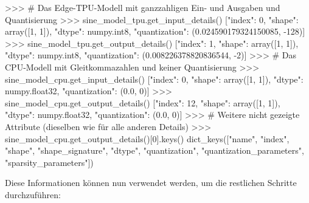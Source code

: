 \begin{pyconcode}
>>> # Das Edge-TPU-Modell mit ganzzahligen Ein- und Ausgaben und Quantisierung
>>> sine_model_tpu.get_input_details()
[{"index": 0,
  "shape": array([1, 1]),
  "dtype": numpy.int8,
  "quantization": (0.024590179324150085, -128)}]
>>> sine_model_tpu.get_output_details()
[{"index": 1,
  "shape": array([1, 1]),
  "dtype": numpy.int8,
  "quantization": (0.008226378820836544, -2)}]
>>> # Das CPU-Modell mit Gleitkommazahlen und keiner Quantisierung
>>> sine_model_cpu.get_input_details()
[{"index": 0,
  "shape": array([1, 1]),
  "dtype": numpy.float32,
  "quantization": (0.0, 0)}]
>>> sine_model_cpu.get_output_details()
[{"index": 12,
  "shape": array([1, 1]),
  "dtype": numpy.float32,
  "quantization": (0.0, 0)}]
>>> # Weitere nicht gezeigte Attribute (dieselben wie für alle anderen Details)
>>> sine_model_cpu.get_output_details()[0].keys()
dict_keys(["name", "index", "shape", "shape_signature", "dtype",
           "quantization", "quantization_parameters", "sparsity_parameters"])
\end{pyconcode}
Diese Informationen können nun verwendet werden, um die
restlichen Schritte durchzuführen:
